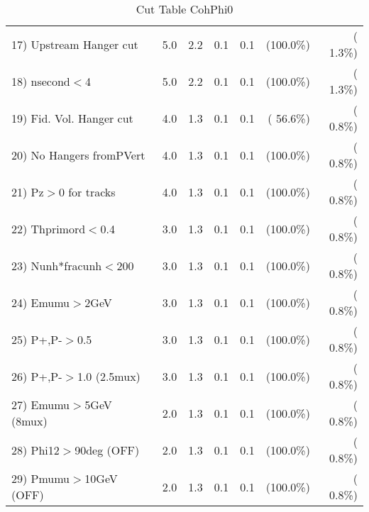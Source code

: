 \begin{table}[h!]
\begin{tabular}{||l||r|r|r|r|r|r||}
 17) Upstream Hanger cut  &          5.0 &          2.2 &          0.1 &          0.1 & (100.0\%) & (  1.3\%) \\
 18) nsecond$<$4          &          5.0 &          2.2 &          0.1 &          0.1 & (100.0\%) & (  1.3\%) \\
 19) Fid. Vol. Hanger cut &          4.0 &          1.3 &          0.1 &          0.1 & ( 56.6\%) & (  0.8\%) \\
 20) No Hangers fromPVert &          4.0 &          1.3 &          0.1 &          0.1 & (100.0\%) & (  0.8\%) \\
 21) Pz$>$0 for tracks    &          4.0 &          1.3 &          0.1 &          0.1 & (100.0\%) & (  0.8\%) \\
 22) Thprimord$<$0.4      &          3.0 &          1.3 &          0.1 &          0.1 & (100.0\%) & (  0.8\%) \\
 23) Nunh*fracunh$<$200   &          3.0 &          1.3 &          0.1 &          0.1 & (100.0\%) & (  0.8\%) \\
 24) Emumu$>$2GeV         &          3.0 &          1.3 &          0.1 &          0.1 & (100.0\%) & (  0.8\%) \\
 25) P+,P-$>$0.5          &          3.0 &          1.3 &          0.1 &          0.1 & (100.0\%) & (  0.8\%) \\
 26) P+,P-$>$1.0 (2.5mux) &          3.0 &          1.3 &          0.1 &          0.1 & (100.0\%) & (  0.8\%) \\
 27) Emumu$>$5GeV  (8mux) &          2.0 &          1.3 &          0.1 &          0.1 & (100.0\%) & (  0.8\%) \\
 28) Phi12$>$90deg  (OFF) &          2.0 &          1.3 &          0.1 &          0.1 & (100.0\%) & (  0.8\%) \\
 29) Pmumu$>$10GeV  (OFF) &          2.0 &          1.3 &          0.1 &          0.1 & (100.0\%) & (  0.8\%) \\
 \hline
 \hline
 \end{tabular}
 \caption{Cut Table  CohPhi0  }
 \label{tab-cutcohjpsi-mumu_cohphi0}
 \end{table}
